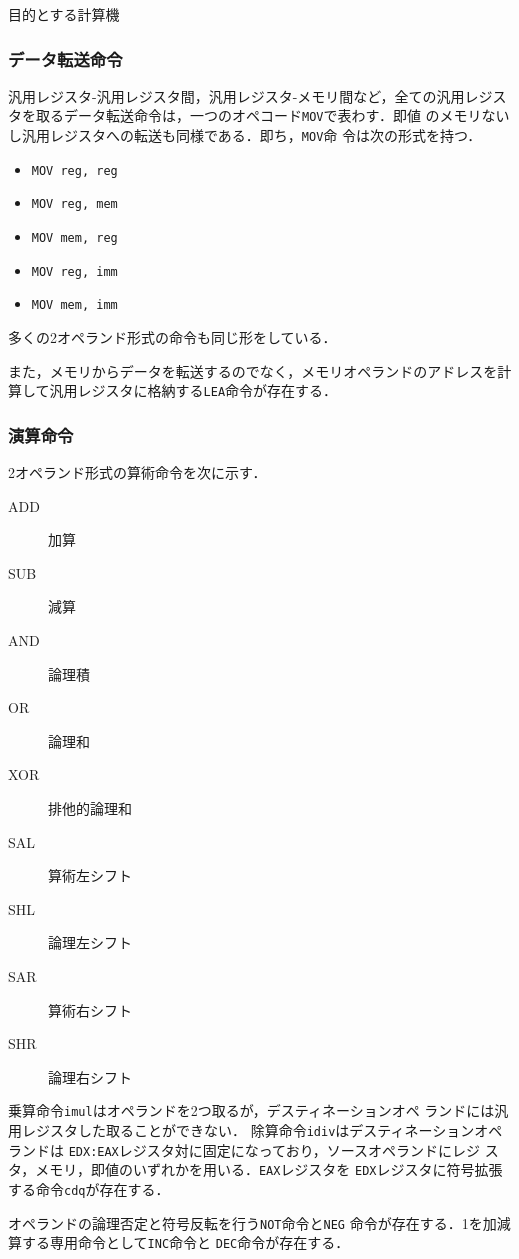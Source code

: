 \documentclass[a4paper,titlepage,report,disablejfam]{jsbook}
\begin{document}
\begin{resbonsiblesection}{目的とする計算機}{\kobori}
\subsubsection{データ転送命令}
汎用レジスタ-汎用レジスタ間，汎用レジスタ-メモリ間など，全ての汎用レジス
タを取るデータ転送命令は，一つのオペコード\lstinline|MOV|で表わす．即値
のメモリないし汎用レジスタへの転送も同様である．即ち，\lstinline|MOV|命
令は次の形式を持つ．
\begin{itemize}
 \item \lstinline|MOV reg, reg|
 \item \lstinline|MOV reg, mem|
 \item \lstinline|MOV mem, reg|
 \item \lstinline|MOV reg, imm|
 \item \lstinline|MOV mem, imm|
\end{itemize}
多くの2オペランド形式の命令も同じ形をしている．

また，メモリからデータを転送するのでなく，メモリオペランドのアドレスを計
算して汎用レジスタに格納する\lstinline|LEA|命令が存在する．

\subsubsection{演算命令}
2オペランド形式の算術命令を次に示す．
\begin{description}
 \item[ADD] 加算
 \item[SUB] 減算
 \item[AND] 論理積
 \item[OR] 論理和
 \item[XOR] 排他的論理和
 \item[SAL] 算術左シフト
 \item[SHL] 論理左シフト
 \item[SAR] 算術右シフト
 \item[SHR] 論理右シフト
\end{description}

乗算命令\lstinline|imul|はオペランドを2つ取るが，デスティネーションオペ
ランドには汎用レジスタした取ることができない．
除算命令\lstinline|idiv|はデスティネーションオペランドは
\lstinline|EDX:EAX|レジスタ対に固定になっており，ソースオペランドにレジ
スタ，メモリ，即値のいずれかを用いる．\lstinline|EAX|レジスタを
\lstinline|EDX|レジスタに符号拡張する命令\lstinline|cdq|が存在する．

オペランドの論理否定と符号反転を行う\lstinline|NOT|命令と\lstinline|NEG|
命令が存在する．1を加減算する専用命令として\lstinline|INC|命令と
\lstinline|DEC|命令が存在する．


\end{resbonsiblesection}
\end{document}
